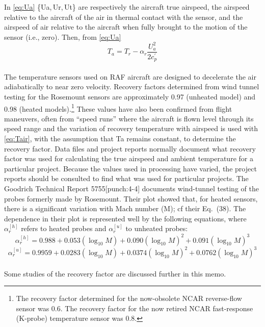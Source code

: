 \documentclass[
  english,
]{book}
\begin{document}
In \eqref{eq:Ua} {\{Ua, Ur, Ut\}} are respectively the aircraft true airspeed, the airspeed relative to the aircraft of the air in thermal contact with the sensor, and the airspeed of air relative to the aircraft when fully brought to the motion of the sensor (i.e., zero). Then, from \eqref{eq:Ua} \begin{equation}
T_{a}=T_{r}-\alpha_{r}\frac{U_{a}^{2}}{2c_{p}^{\prime}}
\label{eq:Tair}
\end{equation}\\
The temperature sensors used on RAF aircraft are designed to decelerate the air adiabatically to near zero velocity. Recovery factors determined from wind tunnel testing for the Rosemount sensors are approximately 0.97 (unheated model) and 0.98 (heated models).\footnote{The recovery factor determined for the now-obsolete NCAR reverse-flow sensor was 0.6. The recovery factor for the now retired NCAR fast-response (K-probe) temperature sensor was 0.8.}
These values have also been confirmed from flight maneuvers, often from ``speed runs'' where the aircraft is flown level through its speed range and the variation of recovery temperature with airspeed is used with \eqref{eq:Tair}, with the assumption that {Ta} remains constant, to determine the recovery factor. Data files and project reports normally document what recovery factor was used for calculating the true airspeed and ambient temperature for a particular project.
Because the values used in processing have varied, the project reports should be consulted to find what was used for particular projects. The Goodrich Technical Report 5755\protect\hypertarget{punch:4-4}{}{{[}punch:4-4{]}} documents wind-tunnel testing of the probes formerly made by Rosemount. Their plot showed that, for heated sensors, there is a significant variation with Mach number ({M}); cf their Eq.~(38). The dependence in their plot is represented well by the following equations, where \(\alpha_r^{[h]}\) refers to heated probes and \(\alpha_r^{[u]}\) to unheated probes:\\
\begin{equation}
\alpha_r^{[h]} = 0.988+0.053(\log_{10}M)+0.090(\log_{10}M)^2+0.091(\log_{10}M)^3
\label{eq:alphah}
\end{equation}
\begin{equation}
\alpha_r^{[u]}=0.9959+0.0283(\log_{10}M)+0.0374(\log_{10}M)^2+0.0762(\log_{10}M)^3
\label{eq:alphau}
\end{equation}\\
Some studies of the recovery factor are discussed further in this memo.
\end{document}
